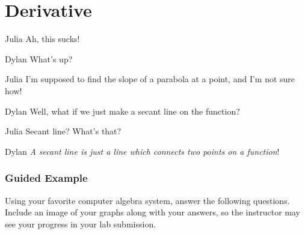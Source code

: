 \documentclass{ximera}
\begin{document}
\section{Derivative}
\begin{dialogue}
\item[Julia] Ah, this sucks!
\item[Dylan] What's up?
\item[Julia] I'm supposed to find the slope of a parabola at a point, and I'm not sure how!
\item[Dylan] Well, what if we just make a secant line on the function?
\item[Julia] Secant line? What's that?
\item[Dylan] \textit{A secant line is just a line which connects two points on a function}!
\end{dialogue}

\subsubsection{Guided Example}
Using your favorite computer algebra system, answer the following questions. Include an image of your graphs along with your answers, so the instructor may see your progress in your lab submission.
\end{document}
